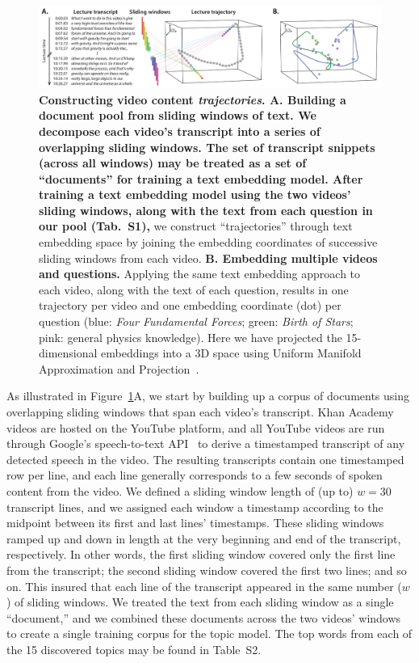 \documentclass[10pt]{article}
\newcommand{\questions}{S1}
\newcommand{\topics}{S2}
\begin{document}
\begin{figure}[tp]
\centering
\includegraphics[width=\textwidth]{figs/sliding_windows}

\caption{\textbf{Constructing video content \textit{trajectories}. \textbf{A.
Building a document pool from sliding windows of text.} We decompose each
video's transcript into a series of overlapping sliding windows. The set of
transcript snippets (across all windows) may be treated as a set of
``documents'' for training a text embedding model. After training a text
embedding model using the two videos' sliding windows, along with the text from
each question in our pool (Tab.~\questions), } we construct ``trajectories''
through text embedding space by joining the embedding coordinates of successive
sliding windows from each video. \textbf{B. Embedding multiple videos and
questions.} Applying the same text embedding approach to each video, along with
the text of each question, results in one trajectory per video and one
embedding coordinate (dot) per question (blue: \textit{Four Fundamental
Forces}; green: \textit{Birth of Stars}; pink: general physics knowledge). Here
we have projected the 15-dimensional embeddings into a 3D space using Uniform
Manifold Approximation and Projection~\citep[UMAP;][]{McInEtal18a}.}

\label{fig:sliding-windows}
\end{figure}

As illustrated in Figure~\ref{fig:sliding-windows}A, we start by building up a
corpus of documents using overlapping sliding windows that span each video's
transcript. Khan Academy videos are hosted on the YouTube platform, and all
YouTube videos are run through Google's speech-to-text API~\citep{HalpEtal16}
to derive a timestamped transcript of any detected speech in the video. The
resulting transcripts contain one timestamped row per line, and each line
generally corresponds to a few seconds of spoken content from the video. We
defined a sliding window length of (up to) $w = 30$ transcript lines, and we
assigned each window a timestamp according to the midpoint between its first
and last lines' timestamps. These sliding windows ramped up and down in length
at the very beginning and end of the transcript, respectively. In other words,
the first sliding window covered only the first line from the transcript; the
second sliding window covered the first two lines; and so on. This insured that
each line of the transcript appeared in the same number ($w$) of sliding
windows. We treated the text from each sliding window as a single ``document,''
and we combined these documents across the two videos' windows to create a single
training corpus for the topic model.  The top words from each of the 15 discovered
topics may be found in Table~\topics.
\end{document}
